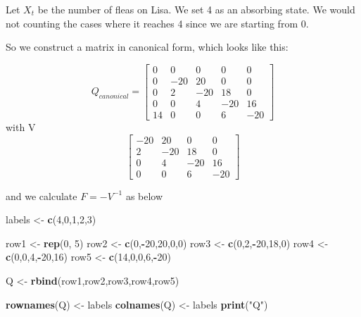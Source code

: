 \documentclass[]{article}
\newenvironment{Shaded}{\begin{snugshade}}{\end{snugshade}}
\newcommand{\DecValTok}[1]{\textcolor[rgb]{0.00,0.00,0.81}{#1}}
\newcommand{\KeywordTok}[1]{\textcolor[rgb]{0.13,0.29,0.53}{\textbf{#1}}}
\newcommand{\NormalTok}[1]{#1}
\newcommand{\OperatorTok}[1]{\textcolor[rgb]{0.81,0.36,0.00}{\textbf{#1}}}
\newcommand{\StringTok}[1]{\textcolor[rgb]{0.31,0.60,0.02}{#1}}
\begin{document}
Let \(X_t\) be the number of fleas on Lisa. We set 4 as an absorbing
state. We would not counting the cases where it reaches 4 since we are
starting from 0.

So we construct a matrix in canonical form, which looks like this:

\[
Q_{canonical}=\left[\begin{array}{ccccc} 0 &0&0&0&0\\ 0&-20&20&0&0 \\ 0 & 2 & -20 & 18 &0\\0&0&4&-20&16\\14&0&0&6&-20 \end{array} \right]
\] with V \[
\left[\begin{array}{cccc} -20&20&0&0 \\ 2 & -20 & 18 &0\\0&4&-20&16\\0&0&6&-20 \end{array} \right]
\]

and we calculate \(F =-V^{-1}\) as below

\begin{Shaded}
\begin{Highlighting}[]
\NormalTok{labels <-}\StringTok{ }\KeywordTok{c}\NormalTok{(}\DecValTok{4}\NormalTok{,}\DecValTok{0}\NormalTok{,}\DecValTok{1}\NormalTok{,}\DecValTok{2}\NormalTok{,}\DecValTok{3}\NormalTok{)}

\NormalTok{row1 <-}\StringTok{ }\KeywordTok{rep}\NormalTok{(}\DecValTok{0}\NormalTok{, }\DecValTok{5}\NormalTok{)}
\NormalTok{row2 <-}\StringTok{ }\KeywordTok{c}\NormalTok{(}\DecValTok{0}\NormalTok{,}\OperatorTok{-}\DecValTok{20}\NormalTok{,}\DecValTok{20}\NormalTok{,}\DecValTok{0}\NormalTok{,}\DecValTok{0}\NormalTok{)}
\NormalTok{row3 <-}\StringTok{ }\KeywordTok{c}\NormalTok{(}\DecValTok{0}\NormalTok{,}\DecValTok{2}\NormalTok{,}\OperatorTok{-}\DecValTok{20}\NormalTok{,}\DecValTok{18}\NormalTok{,}\DecValTok{0}\NormalTok{)}
\NormalTok{row4 <-}\StringTok{ }\KeywordTok{c}\NormalTok{(}\DecValTok{0}\NormalTok{,}\DecValTok{0}\NormalTok{,}\DecValTok{4}\NormalTok{,}\OperatorTok{-}\DecValTok{20}\NormalTok{,}\DecValTok{16}\NormalTok{)}
\NormalTok{row5 <-}\StringTok{ }\KeywordTok{c}\NormalTok{(}\DecValTok{14}\NormalTok{,}\DecValTok{0}\NormalTok{,}\DecValTok{0}\NormalTok{,}\DecValTok{6}\NormalTok{,}\OperatorTok{-}\DecValTok{20}\NormalTok{)}

\NormalTok{Q <-}\StringTok{ }\KeywordTok{rbind}\NormalTok{(row1,row2,row3,row4,row5)}

\KeywordTok{rownames}\NormalTok{(Q) <-}\StringTok{ }\NormalTok{labels}
\KeywordTok{colnames}\NormalTok{(Q) <-}\StringTok{ }\NormalTok{labels}
\KeywordTok{print}\NormalTok{(}\StringTok{"Q"}\NormalTok{)}
\end{Highlighting}
\end{Shaded}
\end{document}
